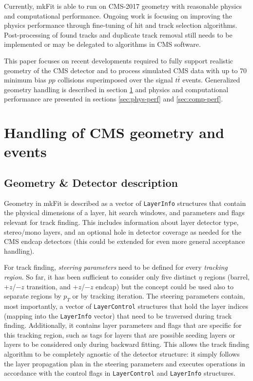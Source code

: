 \documentclass{webofc}
\def\mkfit{mkFit\xspace}
\def\stt#1{{\small\texttt{#1}}}
\begin{document}
Currently, \mkfit is able to run on CMS-2017 geometry with reasonable physics
and computational performance. Ongoing work is focusing on improving the
physics performance through fine-tuning of hit and track selection
algorithms. Post-processing of found tracks and duplicate track removal
still needs to be implemented or may be delegated to algorithms in CMS
software.

This paper focuses on recent developments required to fully support realistic
geometry of the CMS detector and to process simulated
CMS data with up to 70 minimum bias $pp$ collisions superimposed over the
signal $t\bar{t}$ events. Generalized geometry handling is described in
section \ref{sec:cms-geom-and-events} and physics and computational
performance are presented in sections \ref{sec:phys-perf} and
\ref{sec:comp-perf}.


\section{Handling of CMS geometry and events}
\label{sec:cms-geom-and-events}

\subsection{Geometry \& Detector description}

Geometry in \mkfit is described as a vector of \stt{LayerInfo} structures
that contain the physical dimensions of a layer, hit search windows, and parameters
and flags relevant for track finding. This includes information about layer
detector type, stereo/mono layers, and an optional hole in detector
coverage as needed for the CMS endcap detectors (this could be extended for
even more general acceptance handling).

For track finding, \emph{steering parameters} need to be defined for every
\emph{tracking region}. So far, it has been sufficient to consider only five distinct $\eta$
regions (barrel, $+z$/$-z$ transition, and $+z$/$-z$ endcap) but the concept
could be used also to separate regions by $p_T$ or by tracking iteration. The
steering parameters contain, most importantly, a vector of \stt{LayerControl}
structures that hold the layer indices (mapping into the \stt{LayerInfo} vector)
that need to be traversed during track finding. Additionally, it contains
layer parameters and flags that are specific for this tracking region, such as
tags for layers that are possible seeding layers or layers to be considered only
during backward fitting. This allows the track finding algorithm to be completely
agnostic of the detector structure: it simply follows the layer propagation
plan in the steering parameters and executes operations in accordance with the
control flags in \stt{LayerControl} and \stt{LayerInfo} structures.
\end{document}
